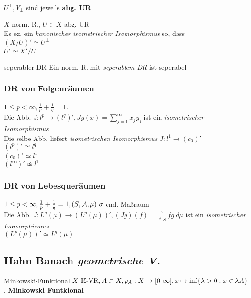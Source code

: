 \begin{bemerkung}
  $U^{\perp}, V_{\perp}$ sind jeweils \textbf{abg. UR}
\end{bemerkung}

\fheel


$X$ norm. R., $U\subset X$ abg. UR.\\
Es ex. ein \textit{kanonischer isometrischer Isomorphismus} so, dass\\
$(X/U)' \simeq U^{\perp}$\\
$ U' \simeq X'/U^{\perp}$\\

\begin{satz}{seperabler DR}
  Ein norm. R. mit \textit{seperablem DR} ist seperabel
\end{satz}

\subsubsection*{DR von Folgenräumen}

$1\leq p < \infty, \frac{1}{p}+\frac{1}{q} = 1$.\\
Die Abb. $J:l^p \to (l^q)', Jy(x)=\sum_{j=1}^\infty x_jy_j$ ist ein
\textit{isometrischer Isomorphismus}\\
Die selbe Abb. liefert \textit{isometrischen Isomorphismus} $J:l^1 \to (c_0)'$\\
$(l^p)' \simeq l^q$\\
$(c_0)' \simeq l^1$\\
$(l^\infty)' \not\simeq l^1$

\subsubsection*{DR von Lebesqueräumen}
$1\leq p < \infty, \frac{1}{p}+\frac{1}{q} = 1, (S,\mathcal{A},\mu)\
\sigma$-end. Maßraum\\
Die Abb. $J: L^q(\mu) \to (L^p(\mu))', (Jg)(f) = \int_S fg\ d\mu$ ist ein
\textit{isometrischer Isomorphismus}\\
$(L^p(\mu))' \simeq L^q(\mu)$


\subsection{Hahn Banach \textit{geometrische V.}}

\begin{definition}{Minkowski-Funktional}
  $X \ \mathbb{K} \text{-VR}, A \subset X, p_A:X \to [0,\infty],
  x \mapsto \inf\{\lambda > 0: x \in \lambda A\}$, \textbf{Minkowski Funtkional}
\end{definition}

